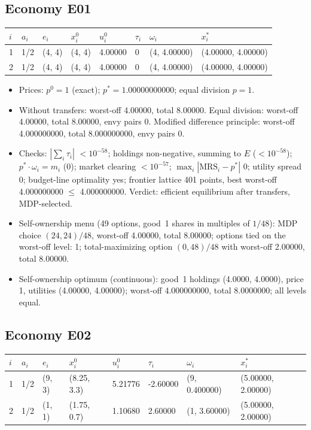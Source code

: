 \subsection*{Economy E01}
\label{ec:E01}
{\scriptsize\setlength{\tabcolsep}{3pt}
\begin{tabular}{@{}llllllll@{}}
\toprule
$i$ & $a_i$ & $e_i$ & $x^0_i$ & $u^0_i$ & $\tau_i$ & $\omega_i$ & $x^*_i$ \\
\midrule
1 & 1/2 & (4, 4) & (4, 4) & 4.00000 & 0 & (4, 4.00000) & (4.00000, 4.00000) \\
2 & 1/2 & (4, 4) & (4, 4) & 4.00000 & 0 & (4, 4.00000) & (4.00000, 4.00000) \\
\bottomrule\end{tabular}}

\begin{itemize}[leftmargin=1.2em,itemsep=0pt,topsep=2pt]\footnotesize
\item Prices: $p^0 = 1$ (exact); $p^* = 1.00000000000$; equal division $p = 1$.
\item Without transfers: worst-off 4.00000, total 8.00000. Equal division: worst-off 4.00000, total 8.00000, envy pairs 0. Modified difference principle: worst-off 4.000000000, total 8.000000000, envy pairs 0.
\item Checks: $|\sum_i\tau_i|$ $<10^{-58}$; holdings non-negative, summing to $E$ ($<10^{-58}$); $p^*\cdot\omega_i = m_i$ (0); market clearing $<10^{-57}$; $\max_i|\mathrm{MRS}_i - p^*|$ 0; utility spread 0; budget-line optimality yes; frontier lattice 401 points, best worst-off 4.000000000 $\leq$ 4.000000000. Verdict: efficient equilibrium after transfers, MDP-selected.
\item Self-ownership menu (49 options, good~1 shares in multiples of $1/48$): MDP choice $(24, 24)/48$, worst-off 4.00000, total 8.00000; options tied on the worst-off level: 1; total-maximizing option $(0, 48)/48$ with worst-off 2.00000, total 8.00000.
\item Self-ownership optimum (continuous): good~1 holdings (4.0000, 4.0000), price 1, utilities (4.00000, 4.00000); worst-off 4.000000000, total 8.0000000; all levels equal.
\end{itemize}

\subsection*{Economy E02}
\label{ec:E02}
{\scriptsize\setlength{\tabcolsep}{3pt}
\begin{tabular}{@{}llllllll@{}}
\toprule
$i$ & $a_i$ & $e_i$ & $x^0_i$ & $u^0_i$ & $\tau_i$ & $\omega_i$ & $x^*_i$ \\
\midrule
1 & 1/2 & (9, 3) & (8.25, 3.3) & 5.21776 & -2.60000 & (9, 0.400000) & (5.00000, 2.00000) \\
2 & 1/2 & (1, 1) & (1.75, 0.7) & 1.10680 & 2.60000 & (1, 3.60000) & (5.00000, 2.00000) \\
\bottomrule\end{tabular}}

